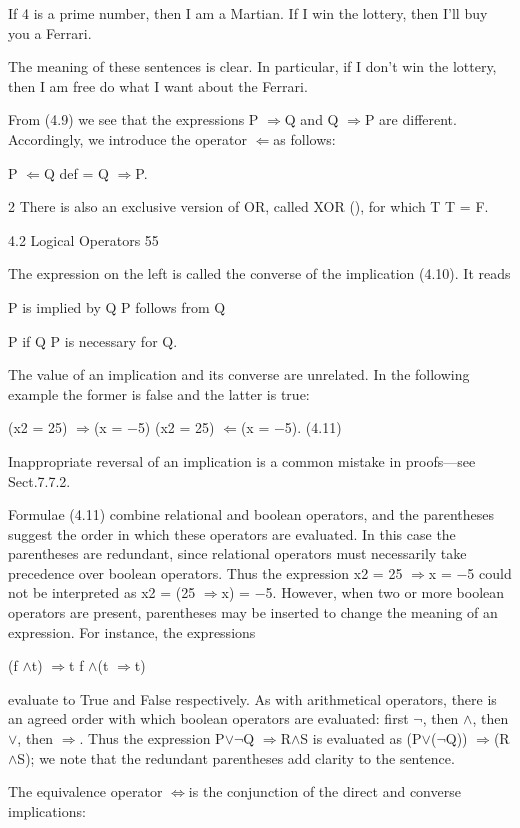 \documentclass[11pt]{article}
\theoremstyle{plain}
\theoremstyle{definition}
\begin{document}
If 4 is a prime number, then I am a Martian. If I win the lottery, then I'll buy you a Ferrari.

The meaning of these sentences is clear. In particular, if I don't win the lottery, then I am free do what I want about the Ferrari.

From (4.9) we see that the expressions P $\Rightarrow$Q and Q $\Rightarrow$P are different. Accordingly, we introduce the operator $\Leftarrow$as follows:

P $\Leftarrow$Q def = Q $\Rightarrow$P.

2 There is also an exclusive version of OR, called XOR (), for which T T = F.

4.2 Logical Operators 55

The expression on the left is called the converse of the implication (4.10). It reads

P is implied by Q P follows from Q

P if Q P is necessary for Q.

The value of an implication and its converse are unrelated. In the following example the former is false and the latter is true:

(x2 = 25) $\Rightarrow$(x = $-$5) (x2 = 25) $\Leftarrow$(x = $-$5). (4.11)

Inappropriate reversal of an implication is a common mistake in proofs---see Sect.7.7.2.

Formulae (4.11) combine relational and boolean operators, and the parentheses suggest the order in which these operators are evaluated. In this case the parentheses are redundant, since relational operators must necessarily take precedence over boolean operators. Thus the expression x2 = 25 $\Rightarrow$x = $-$5 could not be interpreted as x2 = (25 $\Rightarrow$x) = $-$5. However, when two or more boolean operators are present, parentheses may be inserted to change the meaning of an expression. For instance, the expressions

(f $\land$t) $\Rightarrow$t f $\land$(t $\Rightarrow$t)

evaluate to True and False respectively. As with arithmetical operators, there is an agreed order with which boolean operators are evaluated: first $\neg$, then $\land$, then $\lor$, then $\Rightarrow$. Thus the expression P$\lor$$\neg$Q $\Rightarrow$R$\land$S is evaluated as (P$\lor$($\neg$Q)) $\Rightarrow$(R$\land$S); we note that the redundant parentheses add clarity to the sentence.

The equivalence operator $\Leftrightarrow$is the conjunction of the direct and converse implications:
\end{document}

